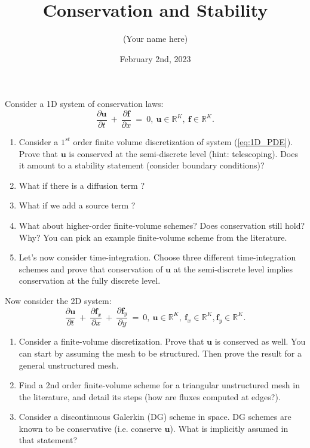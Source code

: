 \documentclass{article}
\title{Conservation and Stability}
\author{(Your name here)}
\date{February 2nd, 2023}
\begin{document}
\maketitle

Consider a 1D system of conservation laws:
\begin{equation}\label{eq:1D_PDE}
    \frac{\partial \mathbf{u}}{\partial t} \ + \ \frac{\partial \mathbf{f}}{\partial x} \ = \ 0, \ \mathbf{u} \in \mathbb{R}^{K}, \ \mathbf{f} \in \mathbb{R}^{K}.
\end{equation} 
\begin{enumerate}
    \item Consider a $1^{st}$ order finite volume discretization of system (\ref{eq:1D_PDE}). Prove that $\mathbf{u}$ is conserved at the semi-discrete level (hint: telescoping). Does it amount to a stability statement (consider boundary conditions)? 
    \item What if there is a diffusion term ? 
    \item What if we add a source term ?
    \item What about higher-order finite-volume schemes? Does conservation still hold? Why? You can pick an example finite-volume scheme from the literature.
    \item Let's now consider time-integration. Choose three different time-integration schemes and prove that conservation of $\mathbf{u}$ at the semi-discrete level implies conservation at the fully discrete level.
\end{enumerate} 
\hspace*{0.4 cm} Now consider the 2D system:
\begin{equation}\label{eq:2D_PDE}
     \frac{\partial \mathbf{u}}{\partial t} \ + \ \frac{\partial \mathbf{f}_x}{\partial x} \ + \ \frac{\partial \mathbf{f}_y}{\partial y} \ = \ 0, \ \mathbf{u} \in \mathbb{R}^{K}, \ \mathbf{f}_x \in \mathbb{R}^{K}, \mathbf{f}_y \in \mathbb{R}^{K}.
\end{equation}
\begin{enumerate}
    \item Consider a finite-volume discretization. Prove that $\mathbf{u}$ is conserved as well. You can start by assuming the mesh to be structured. Then prove the result for a general unstructured mesh.
    \item Find a 2nd order finite-volume scheme for a triangular unstructured mesh in the literature, and detail its steps (how are fluxes computed at edges?).
    \item Consider a discontinuous Galerkin (DG) scheme in space. DG schemes are known to be conservative (i.e. conserve $\mathbf{u}$). What is implicitly assumed in that statement?
\end{enumerate}
\end{document}
